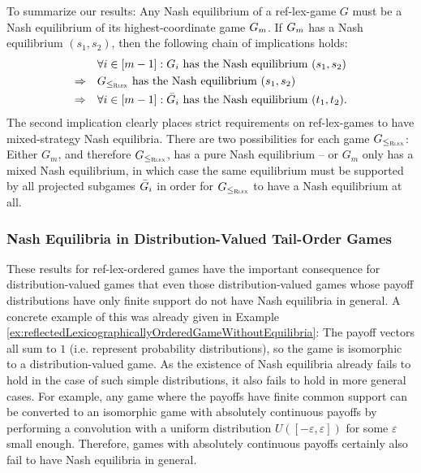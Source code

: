 \documentclass[a4paper]{scrreprt}
\let\epsilon\varepsilon
\theoremstyle{definition}
\begin{document}
    To summarize our results: Any Nash equilibrium of a ref-lex-game $G$ must be a Nash equilibrium of its highest-coordinate game $G_{m}$.
    If $G_{m}$ has a Nash equilibrium $(s_1, s_2)$, then the following chain of implications holds:
    \begin{align*}
         &\forall i \in [m - 1]: G_{i} \text{ has the Nash equilibrium } (s_1, s_2) \\
         \Rightarrow\quad &G_{\leq_{\textsc{Rlex}}} \text{ has the Nash equilibrium } (s_1, s_2) \\
         \Rightarrow\quad &\forall i \in [m-1]: \bar{G}_{i} \text{ has the Nash equilibrium } (t_1, t_2).
    \end{align*}
    The second implication clearly places strict requirements on ref-lex-games to have mixed-strategy Nash equilibria. There are two possibilities for each game $G_{\leq_{\textsc{Rlex}}}$: Either $G_m$, and therefore $G_{\leq_{\textsc{Rlex}}}$, has a pure Nash equilibrium -- or $G_m$ only has a mixed Nash equilibrium, in which case the same equilibrium must be supported by all projected subgames $\bar{G}_{i}$ in order for $G_{\leq_{\textsc{Rlex}}}$ to have a Nash equilibrium at all.
    
    
    \subsubsection{Nash Equilibria in Distribution-Valued Tail-Order Games}
    These results for ref-lex-ordered games have the important consequence for distribution-valued games that even those distribution-valued games whose payoff distributions have only finite support do not have Nash equilibria in general.
    A concrete example of this was already given in Example \ref{ex:reflectedLexicographicallyOrderedGameWithoutEquilibria}: The payoff vectors all sum to $1$ (i.e. represent probability distributions), so the game is isomorphic to a distribution-valued game.
    As the existence of Nash equilibria already fails to hold in the case of such simple distributions, it also fails to hold in more general cases.
    For example, any game where the payoffs have finite common support can be converted to an isomorphic game with absolutely continuous payoffs by performing a convolution with a uniform distribution $U([-\epsilon, \epsilon])$ for some $\epsilon$ small enough. Therefore, games with absolutely continuous payoffs certainly also fail to have Nash equilibria in general.
\end{document}
